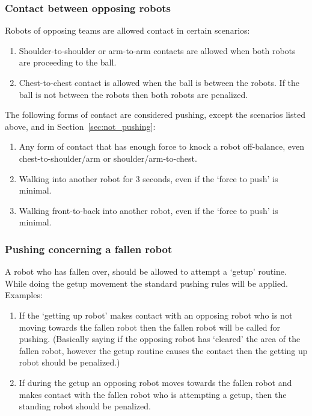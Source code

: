 \documentclass[12pt]{article}
\begin{document}
\subsubsection{Contact between opposing robots}

Robots of opposing teams are allowed contact in certain scenarios:

\begin{enumerate}

\item Shoulder-to-shoulder or arm-to-arm contacts are allowed when both robots are proceeding to the ball.

\item Chest-to-chest contact is allowed when the ball is between the robots. If the ball is not between the robots then both robots are penalized.

\end{enumerate}

The following forms of contact are considered pushing, except the scenarios listed above, and in Section~\ref{sec:not_pushing}:

\begin{enumerate}

\item Any form of contact that has enough force to knock a robot off-balance, even chest-to-shoulder/arm or shoulder/arm-to-chest.

\item Walking into another robot for 3 seconds, even if the `force to push' is minimal.

\item Walking front-to-back into another robot, even if the `force to push' is minimal.
\end{enumerate}

\subsubsection{Pushing concerning a fallen robot}

A robot who has fallen over, should be allowed to attempt a `getup'
routine. While doing the getup movement the standard pushing rules will be applied. Examples:

\begin{enumerate}

\item If the `getting up robot' makes contact with an opposing robot who is not moving towards the fallen robot then the fallen robot will be called for pushing. (Basically saying if the opposing robot has `cleared' the area of the fallen robot, however the getup routine causes the contact then the getting up robot should be penalized.)

\item If during the getup an opposing robot moves towards the fallen robot and makes contact with the fallen robot who is attempting a getup, then the standing robot should be penalized.

\end{enumerate}
\end{document}
